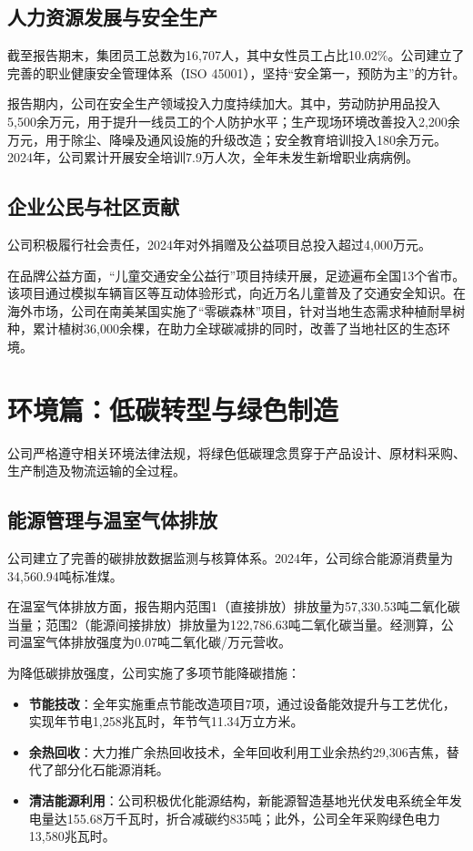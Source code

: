 \documentclass[a4paper,12pt]{article}
\begin{document}
\subsection{人力资源发展与安全生产}

截至报告期末，集团员工总数为16,707人，其中女性员工占比10.02\%。公司建立了完善的职业健康安全管理体系（ISO 45001），坚持“安全第一，预防为主”的方针。

报告期内，公司在安全生产领域投入力度持续加大。其中，劳动防护用品投入5,500余万元，用于提升一线员工的个人防护水平；生产现场环境改善投入2,200余万元，用于除尘、降噪及通风设施的升级改造；安全教育培训投入180余万元。2024年，公司累计开展安全培训7.9万人次，全年未发生新增职业病病例。

\subsection{企业公民与社区贡献}

公司积极履行社会责任，2024年对外捐赠及公益项目总投入超过4,000万元。

在品牌公益方面，“儿童交通安全公益行”项目持续开展，足迹遍布全国13个省市。该项目通过模拟车辆盲区等互动体验形式，向近万名儿童普及了交通安全知识。在海外市场，公司在南美某国实施了“零碳森林”项目，针对当地生态需求种植耐旱树种，累计植树36,000余棵，在助力全球碳减排的同时，改善了当地社区的生态环境。

\section{环境篇：低碳转型与绿色制造}

公司严格遵守相关环境法律法规，将绿色低碳理念贯穿于产品设计、原材料采购、生产制造及物流运输的全过程。

\subsection{能源管理与温室气体排放}

公司建立了完善的碳排放数据监测与核算体系。2024年，公司综合能源消费量为34,560.94吨标准煤。

在温室气体排放方面，报告期内范围1（直接排放）排放量为57,330.53吨二氧化碳当量；范围2（能源间接排放）排放量为122,786.63吨二氧化碳当量。经测算，公司温室气体排放强度为0.07吨二氧化碳/万元营收。

为降低碳排放强度，公司实施了多项节能降碳措施：
\begin{itemize}
    \item \textbf{节能技改}：全年实施重点节能改造项目7项，通过设备能效提升与工艺优化，实现年节电1,258兆瓦时，年节气11.34万立方米。
    \item \textbf{余热回收}：大力推广余热回收技术，全年回收利用工业余热约29,306吉焦，替代了部分化石能源消耗。
    \item \textbf{清洁能源利用}：公司积极优化能源结构，新能源智造基地光伏发电系统全年发电量达155.68万千瓦时，折合减碳约835吨；此外，公司全年采购绿色电力13,580兆瓦时。
\end{itemize}
\end{document}
